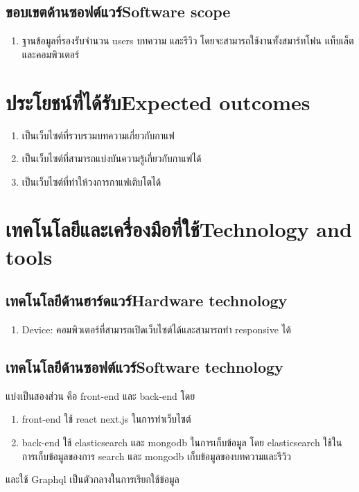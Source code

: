 \subsection{\ifcpe ขอบเขตด้านซอฟต์แวร์\else Software scope\fi}
\begin{enumerate}
    \item ฐานข้อมูลที่รองรับจำนวน users บทความ และรีวิว โดยจะสามารถใช้งานทั้งสมาร์ทโฟน แท็บเล็ต และคอมพิวเตอร์
\end{enumerate}
\section{\ifcpe ประโยชน์ที่ได้รับ\else Expected outcomes\fi}
\begin{enumerate}
    \item เป็นเว็บไซต์ที่รวบรวมบทความเกี่ยวกับกาแฟ
    \item เป็นเว็บไซต์ที่สามารถแบ่งบันความรู้เกี่ยวกับกาแฟได้
    \item เป็นเว็บไซต์ที่ทำให้วงการกาแฟเติบโตได้
\end{enumerate}

\section{\ifcpe เทคโนโลยีและเครื่องมือที่ใช้\else Technology and tools\fi}

\subsection{\ifcpe เทคโนโลยีด้านฮาร์ดแวร์\else Hardware technology\fi}
\begin{enumerate}
    \item Device: คอมพิวเตอร์ที่สามารถเปิดเว็บไซต์ได้และสามารถทำ responsive ได้
\end{enumerate}

\subsection{\ifcpe เทคโนโลยีด้านซอฟต์แวร์\else Software technology\fi}
แบ่งเป็นสองส่วน คือ front-end และ back-end โดย
\begin{enumerate}
    \item front-end ใช้ react next.js ในการทำเว็บไซต์
    \item back-end ใช้ elasticsearch และ mongodb ในการเก็บข้อมูล โดย elasticsearch ใช้ในการเก็บข้อมูลของการ search และ mongodb เก็บข้อมูลของบทความและรีวิว
\end{enumerate}
และใช้ Graphql เป็นตัวกลางในการเรียกใช้ข้อมูล

